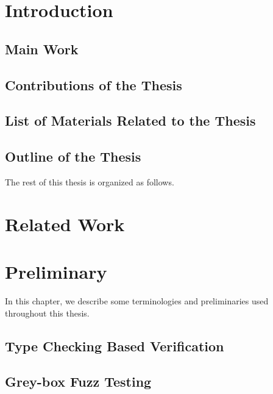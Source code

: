 \documentclass[12pt, a4paper, oneside]{Thesis}
\begin{document}
\chapter{Introduction} \label{Chapter1}

\section{Main Work}

\section{Contributions of the Thesis}

\section{List of Materials Related to the Thesis}

\section{Outline of the Thesis}

The rest of this thesis is organized as follows.
 
\fancyhead[RE,LO]{\fancyplain{}{\leftmark}}
\renewcommand{\chaptermark}[1]{\markboth{\chaptername\ \thechapter.\ \emph{Related Work}}{}}
\chapter{Related Work} \label{Chapter2}
 
\fancyhead[RE,LO]{\fancyplain{}{\leftmark}}
\renewcommand{\chaptermark}[1]{\markboth{\chaptername\ \thechapter.\ \emph{Preliminaries}}{}}
\chapter{Preliminary} \label{Chapter3}

In this chapter, we describe some terminologies and preliminaries used throughout this thesis.

\section{Type Checking Based Verification}

\section{Grey-box Fuzz Testing} 
\fancyhead[RE,LO]{\fancyplain{}{\leftmark}}
\renewcommand{\chaptermark}[1]{\markboth{\chaptername\ \thechapter.\ \emph{Vulnerability Detection Techniques}}{}}
\end{document}
